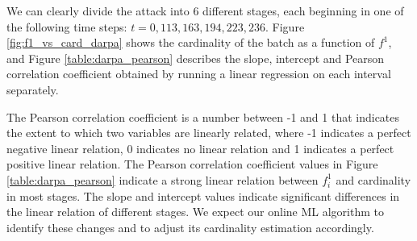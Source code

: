 		We can clearly divide the attack into 6 different stages, each beginning in one of the following time steps: $t=0, 113, 163, 194, 223, 236$. Figure \ref{fig:f1_vs_card_darpa} shows the cardinality of the batch as a function of $f^1$, and Figure \ref{table:darpa_pearson} describes the slope, intercept and Pearson correlation coefficient obtained by running a linear regression on each interval separately.
		
		The Pearson correlation coefficient is a number between -1 and 1 that indicates the extent to which two variables are linearly related, where -1 indicates a perfect negative linear relation, 0 indicates no linear relation and 1 indicates a perfect positive linear relation. The Pearson correlation coefficient values in Figure \ref{table:darpa_pearson} indicate a strong linear relation between $f_i^1$ and cardinality in most stages. The slope and intercept values indicate significant differences in the linear relation of different stages. We expect our online ML algorithm to identify these changes and to adjust its cardinality estimation accordingly.

